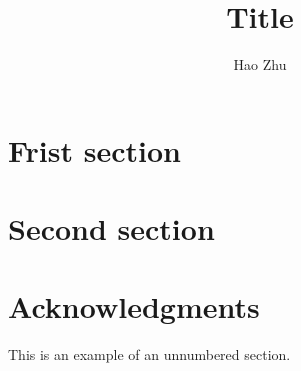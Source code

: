 \documentclass{article}
\title{Title}
\author{Hao Zhu}
\affil{Department of Computer Science, University of Freiburg}
\begin{document}
\maketitle

\begin{abstract}
\lipsum[1]
\end{abstract}

\newpage
\tableofcontents
\newpage

\section{Frist section}
\lipsum[1]

\section{Second section}
\lipsum[1]
\cite{boyd2004convex}

\section*{Acknowledgments}
This is an example of an unnumbered section.

\newpage

\end{document}
